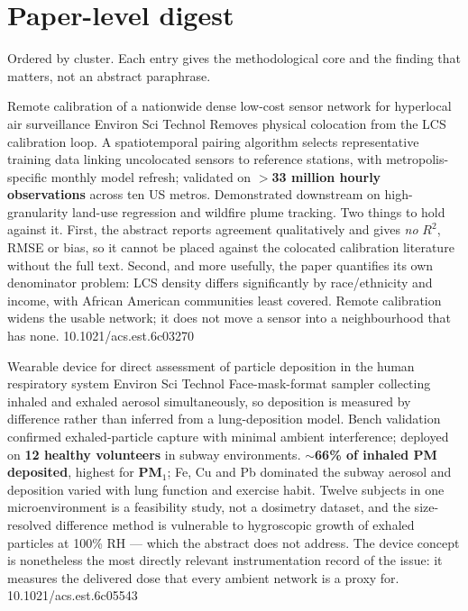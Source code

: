 \documentclass[10pt]{article}
\begin{document}
\clearpage

\section*{\sffamily\bfseries\color{Deep}Paper-level digest}
\vspace{-1.5mm}{\color{Amber}\rule{\linewidth}{1.1pt}}\vspace{1mm}

{\fontsize{7.4}{9}\selectfont\color{Slate}Ordered by cluster. Each entry gives the
methodological core and the finding that matters, not an abstract paraphrase.\par}


{Remote calibration of a nationwide dense low-cost sensor network for hyperlocal air surveillance}
{Environ Sci Technol}
{Removes physical colocation from the LCS calibration loop. A spatiotemporal pairing
algorithm selects representative training data linking uncolocated sensors to reference
stations, with metropolis-specific monthly model refresh; validated on
\textbf{$>$33 million hourly observations} across ten US metros. Demonstrated downstream on
high-granularity land-use regression and wildfire plume tracking. Two things to hold
against it. First, the abstract reports agreement qualitatively and gives \emph{no}
$R^2$, RMSE or bias, so it cannot be placed against the colocated calibration literature
without the full text. Second, and more usefully, the paper quantifies its own
denominator problem: LCS density differs significantly by race/ethnicity and income, with
African American communities least covered. Remote calibration widens the usable network;
it does not move a sensor into a neighbourhood that has none.}
{10.1021/acs.est.6c03270}

{Wearable device for direct assessment of particle deposition in the human respiratory system}
{Environ Sci Technol}
{Face-mask-format sampler collecting inhaled and exhaled aerosol simultaneously, so
deposition is measured by difference rather than inferred from a lung-deposition model.
Bench validation confirmed exhaled-particle capture with minimal ambient interference;
deployed on \textbf{12 healthy volunteers} in subway environments.
\textbf{$\sim$66\% of inhaled PM deposited}, highest for \textbf{PM$_1$}; Fe, Cu and Pb
dominated the subway aerosol and deposition varied with lung function and exercise habit.
Twelve subjects in one microenvironment is a feasibility study, not a dosimetry dataset,
and the size-resolved difference method is vulnerable to hygroscopic growth of exhaled
particles at 100\% RH --- which the abstract does not address. The device concept is
nonetheless the most directly relevant instrumentation record of the issue: it measures
the delivered dose that every ambient network is a proxy for.}
{10.1021/acs.est.6c05543}
\end{document}

